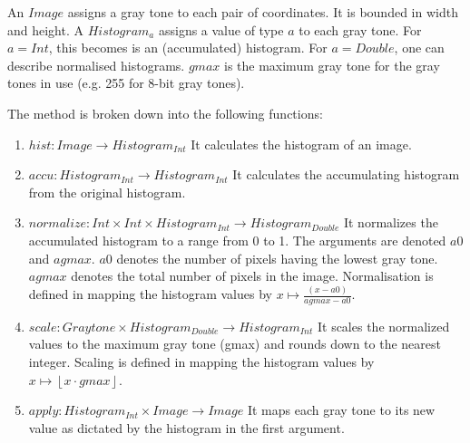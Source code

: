     An $Image$ assigns a gray tone to each pair of coordinates. It is bounded in width and height.
    A $Histogram_a$ assigns a value of type $a$ to each gray tone. For $a = Int$,
    this becomes is an (accumulated) histogram. For $a = Double$, one can
    describe normalised histograms.
    $gmax$ is the maximum gray tone for the gray tones in use (e.g. 255 for 8-bit gray tones).
    
    The method is broken down into the following functions:
      
    \begin{enumerate}
      \item $hist: Image \rightarrow Histogram_{Int}$ \newline
        It calculates the histogram of an image.
      \item $accu: Histogram_{Int} \rightarrow Histogram_{Int}$ \newline
        It calculates the accumulating histogram from the original histogram.
      \item $normalize: Int \times Int \times Histogram_{Int} \rightarrow Histogram_{Double}$  \newline
        It normalizes the accumulated histogram
        to a range from 0 to 1.
        The arguments are denoted $a0$ and $agmax$.
        $a0$ denotes the number of pixels having the lowest gray tone.
        $agmax$ denotes the total number of pixels in the image.
        Normalisation is defined in mapping the histogram values by $x \mapsto \frac{(x - a0)}{agmax - a0}$.
      \item $scale: Graytone \times Histogram_{Double} \rightarrow Histogram_{Int}$  \newline
        It scales the normalized values to the maximum gray tone (gmax) and rounds down to the nearest integer.
        Scaling is defined in mapping the histogram values by $x \mapsto \left \lfloor{x \cdot gmax}\right \rfloor $.
      \item $apply: Histogram_{Int} \times Image \rightarrow Image$  \newline
        It maps each gray tone to its new value as dictated by the histogram in the first argument.
    \end{enumerate}
      
